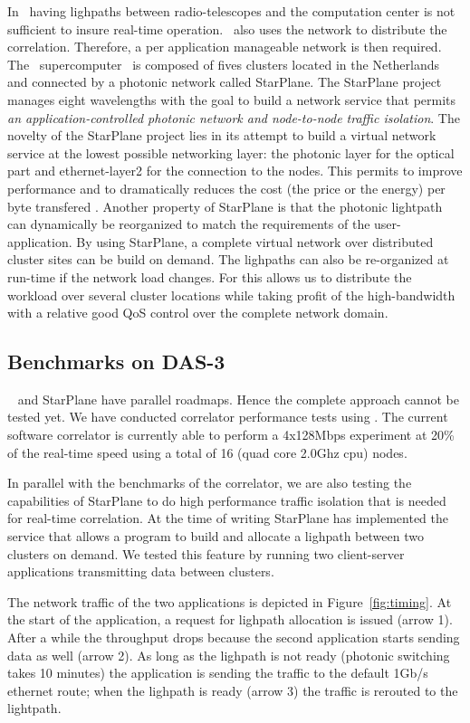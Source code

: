 In \scarie\ having lighpaths between radio-telescopes and the
computation center is not sufficient to insure real-time
operation. \scarie\ also uses the network to distribute the
correlation. Therefore, a per application manageable network is then
required. The \ supercomputer~\cite{das3} is composed of fives
clusters located in the Netherlands and connected by a photonic
network called StarPlane. The StarPlane project manages eight
wavelengths with the goal to build a network service that permits
\textit{an application-controlled photonic network and node-to-node
  traffic isolation}. The novelty of the StarPlane project lies in its
attempt to build a virtual network service at the lowest possible
networking layer: the photonic layer for the optical part and
ethernet-layer2 for the connection to the nodes. This permits to
improve performance and to dramatically reduces the cost (the price or
the energy) per byte transfered \cite{}. Another
property of StarPlane is that the photonic lightpath can dynamically
be reorganized to match the requirements of the user-application. By
using StarPlane, a complete virtual network over distributed cluster
sites can be build on demand. The lighpaths can also be re-organized
at run-time if the network load changes. For \scarie this allows us to
distribute the workload over several cluster locations while taking
profit of the high-bandwidth with a relative good QoS control over the
complete network domain.

\subsection{Benchmarks on DAS-3}
\scarie~ and StarPlane have parallel roadmaps. Hence the complete
approach cannot be tested yet. We have conducted correlator
performance tests using . The current software correlator is
currently able to perform a 4x128Mbps
experiment at 20\% of the real-time speed using a total of 16 (quad
core 2.0Ghz cpu) nodes.

In parallel with the benchmarks of the correlator, we are also testing
the capabilities of StarPlane to do high performance traffic isolation
that is needed for real-time correlation. At the time of writing
StarPlane has implemented the service that allows a program to build
and allocate a lighpath between two clusters on demand. We tested this
feature by running two client-server applications transmitting data
between clusters.

The network traffic of the two applications is depicted in
Figure~\ref{fig:timing}.  At the start of the application, a request
for lighpath allocation is issued (arrow 1). After a while the
throughput drops because the second application starts sending data as
well (arrow 2).  As long as the lighpath is not ready (photonic
switching takes 10 minutes) the application is sending the traffic to
the default 1Gb/s ethernet route; when the lighpath is ready (arrow 3)
the traffic is rerouted to the lightpath.

